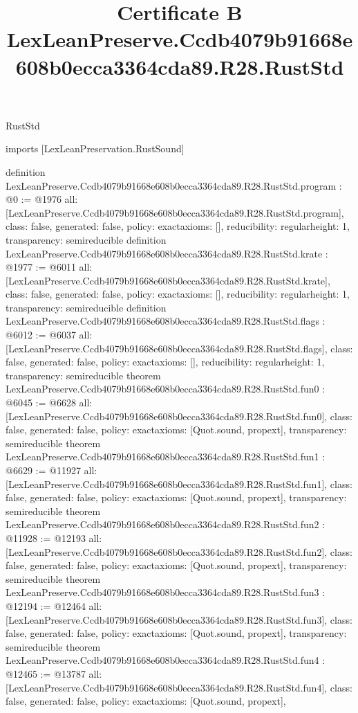 \begin{lexlean}{RustStd}
\title{Certificate B LexLeanPreserve.Ccdb4079b91668e608b0ecca3364cda89.R28.RustStd}
\begin{coremodule}
imports [LexLeanPreservation.RustSound]

definition LexLeanPreserve.Ccdb4079b91668e608b0ecca3364cda89.R28.RustStd.program : @0 := @1976 {
  all: [LexLeanPreserve.Ccdb4079b91668e608b0ecca3364cda89.R28.RustStd.program],
  class: false,
  generated: false,
  policy: exact{axioms: []},
  reducibility: regular{height: 1},
  transparency: semireducible
}
definition LexLeanPreserve.Ccdb4079b91668e608b0ecca3364cda89.R28.RustStd.krate : @1977 := @6011 {
  all: [LexLeanPreserve.Ccdb4079b91668e608b0ecca3364cda89.R28.RustStd.krate],
  class: false,
  generated: false,
  policy: exact{axioms: []},
  reducibility: regular{height: 1},
  transparency: semireducible
}
definition LexLeanPreserve.Ccdb4079b91668e608b0ecca3364cda89.R28.RustStd.flags : @6012 := @6037 {
  all: [LexLeanPreserve.Ccdb4079b91668e608b0ecca3364cda89.R28.RustStd.flags],
  class: false,
  generated: false,
  policy: exact{axioms: []},
  reducibility: regular{height: 1},
  transparency: semireducible
}
theorem LexLeanPreserve.Ccdb4079b91668e608b0ecca3364cda89.R28.RustStd.fun0 : @6045 := @6628 {
  all: [LexLeanPreserve.Ccdb4079b91668e608b0ecca3364cda89.R28.RustStd.fun0],
  class: false,
  generated: false,
  policy: exact{axioms: [Quot.sound, propext]},
  transparency: semireducible
}
theorem LexLeanPreserve.Ccdb4079b91668e608b0ecca3364cda89.R28.RustStd.fun1 : @6629 := @11927 {
  all: [LexLeanPreserve.Ccdb4079b91668e608b0ecca3364cda89.R28.RustStd.fun1],
  class: false,
  generated: false,
  policy: exact{axioms: [Quot.sound, propext]},
  transparency: semireducible
}
theorem LexLeanPreserve.Ccdb4079b91668e608b0ecca3364cda89.R28.RustStd.fun2 : @11928 := @12193 {
  all: [LexLeanPreserve.Ccdb4079b91668e608b0ecca3364cda89.R28.RustStd.fun2],
  class: false,
  generated: false,
  policy: exact{axioms: [Quot.sound, propext]},
  transparency: semireducible
}
theorem LexLeanPreserve.Ccdb4079b91668e608b0ecca3364cda89.R28.RustStd.fun3 : @12194 := @12464 {
  all: [LexLeanPreserve.Ccdb4079b91668e608b0ecca3364cda89.R28.RustStd.fun3],
  class: false,
  generated: false,
  policy: exact{axioms: [Quot.sound, propext]},
  transparency: semireducible
}
theorem LexLeanPreserve.Ccdb4079b91668e608b0ecca3364cda89.R28.RustStd.fun4 : @12465 := @13787 {
  all: [LexLeanPreserve.Ccdb4079b91668e608b0ecca3364cda89.R28.RustStd.fun4],
  class: false,
  generated: false,
  policy: exact{axioms: [Quot.sound, propext]},
}
\end{coremodule}
\end{lexlean}
